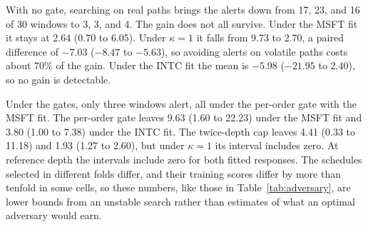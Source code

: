 \documentclass{article}
\begin{document}
With no gate, searching on real paths brings the alerts down from 17, 23, and 16 of 30 windows to 3, 3, and 4. The gain does not all survive. Under the MSFT fit it stays at 2.64 (0.70 to 6.05). Under $\kappa = 1$ it falls from 9.73 to 2.70, a paired difference of $-7.03$ ($-8.47$ to $-5.63$), so avoiding alerts on volatile paths costs about 70\% of the gain. Under the INTC fit the mean is $-5.98$ ($-21.95$ to 2.40), so no gain is detectable.

Under the gates, only three windows alert, all under the per-order gate with the MSFT fit. The per-order gate leaves 9.63 (1.60 to 22.23) under the MSFT fit and 3.80 (1.00 to 7.38) under the INTC fit. The twice-depth cap leaves 4.41 (0.33 to 11.18) and 1.93 (1.27 to 2.60), but under $\kappa = 1$ its interval includes zero. At reference depth the intervals include zero for both fitted responses. The schedules selected in different folds differ, and their training scores differ by more than tenfold in some cells, so these numbers, like those in Table~\ref{tab:adversary}, are lower bounds from an unstable search rather than estimates of what an optimal adversary would earn.
\end{document}
